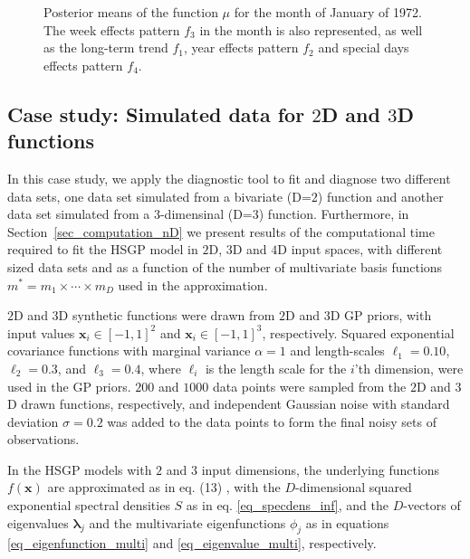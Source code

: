 \begin{figure}%
\centering
{}
\caption{Posterior means of the function $\mu$ for the month of January of 1972. The week effects pattern $f_3$ in the month is also represented, as well as the long-term trend $f_1$, year effects pattern $f_2$ and special days effects pattern $f_4$. }
  \label{fig12_posteriors_onemonth_birthday}
\end{figure}

\subsection{Case study: Simulated data for $2$D and $3$D functions}\label{sec_caseIII}

In this case study, we apply the diagnostic tool to fit and diagnose two different data sets, one data set simulated from a bivariate (D=$2$) function and another data set simulated from a $3$-dimensinal (D=$3$) function. Furthermore, in Section~\ref{sec_computation_nD} we present results of the computational time required to fit the HSGP model in $2$D, $3$D and $4$D input spaces, with different sized data sets and as a function of the number of multivariate basis functions $m^*=m_1\times \cdots \times m_D$ used in the approximation.

$2$D and $3$D synthetic functions were drawn from $2$D and $3$D GP priors, with input values $\bm{x}_i \in [-1,1]^2$ and $\bm{x}_i \in [-1,1]^3$, respectively. Squared exponential covariance functions with marginal variance $\alpha=1$ and length-scales $\ell_1=0.10$, $\ell_2=0.3$, and $\ell_3=0.4$, where $\ell_i$ is the length scale for the $i$'th dimension, were used in the GP priors. $200$ and $1000$ data points were sampled from the $2$D and $3$D drawn functions, respectively, and independent Gaussian noise with standard deviation $\sigma=0.2$ was added to the data points to form the final noisy sets of observations.

In the HSGP models with $2$ and $3$ input dimensions, the underlying functions $f(\bm{x})$ are approximated as in eq. (13)%
, with the $D$-dimensional squared exponential spectral densities $S$ as in eq. \eqref{eq_specdens_inf}, and the $D$-vectors of eigenvalues $\bm{\lambda}_j$ and the multivariate eigenfunctions $\phi_j$ as in equations \eqref{eq_eigenfunction_multi} and \eqref{eq_eigenvalue_multi}, respectively.

